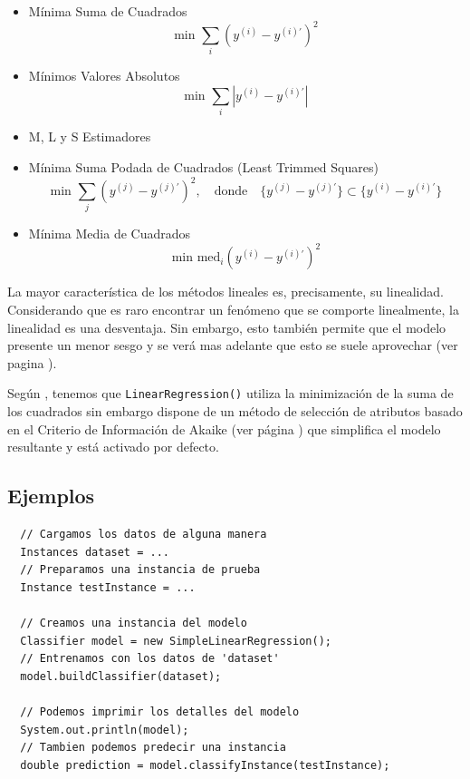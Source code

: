 \documentclass[10pt,a4paper]{article}
\begin{document}
\begin{itemize}
\item Mínima Suma de Cuadrados
  \[
  \text{min }\sum_i (y^{(i)}-y^{(i)'})^2
  \]
\item Mínimos Valores Absolutos
  \[
  \text{min }\sum_i |y^{(i)}-y^{(i)'}|
  \]
\item M, L y S Estimadores
\item Mínima Suma Podada de Cuadrados (Least Trimmed Squares)
  \[
  \text{min }\sum_j (y^{(j)}-y^{(j)'})^2, \quad \text{donde} \quad \{ y^{(j)}-y^{(j)'} \} \subset \{ y^{(i)}-y^{(i)'} \}
  \]
\item Mínima Media de Cuadrados
  \[
  \text{min }\text{med}_i (y^{(i)}-y^{(i)'})^2
  \]
\end{itemize}

La mayor característica de los métodos lineales es, precisamente, su linealidad. Considerando que es raro encontrar un fenómeno que se comporte linealmente, la linealidad es una desventaja. Sin embargo, esto también permite que el modelo presente un menor sesgo y se verá mas adelante que esto se suele aprovechar (ver pagina \pageref{m5p}). 

Según \cite{witten2011data}, tenemos que \lstinline{LinearRegression()} utiliza la minimización de la suma de los cuadrados sin embargo dispone de un método de selección de atributos basado en el Criterio de Información de Akaike (ver página \pageref{modelselection_aic}) que simplifica el modelo resultante y está activado por defecto.

\subsection{Ejemplos}

\begin{lstlisting}
  // Cargamos los datos de alguna manera
  Instances dataset = ...
  // Preparamos una instancia de prueba
  Instance testInstance = ...
  
  // Creamos una instancia del modelo
  Classifier model = new SimpleLinearRegression();
  // Entrenamos con los datos de 'dataset'
  model.buildClassifier(dataset);
  
  // Podemos imprimir los detalles del modelo
  System.out.println(model);
  // Tambien podemos predecir una instancia
  double prediction = model.classifyInstance(testInstance);
\end{lstlisting}
\end{document}
